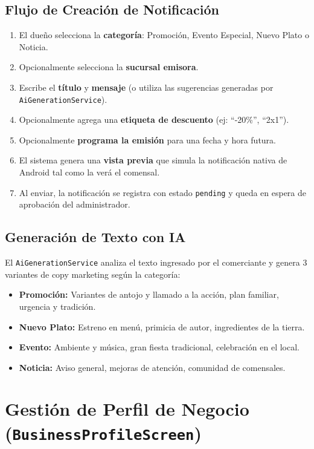 \documentclass[11pt, a4paper, oneside]{report}
\begin{document}
\subsection{Flujo de Creación de Notificación}
\begin{enumerate}
  \item El dueño selecciona la \textbf{categoría}: Promoción, Evento Especial, Nuevo Plato o Noticia.
  \item Opcionalmente selecciona la \textbf{sucursal emisora}.
  \item Escribe el \textbf{título} y \textbf{mensaje} (o utiliza las sugerencias generadas por \texttt{AiGenerationService}).
  \item Opcionalmente agrega una \textbf{etiqueta de descuento} (ej: ``-20\%'', ``2x1'').
  \item Opcionalmente \textbf{programa la emisión} para una fecha y hora futura.
  \item El sistema genera una \textbf{vista previa} que simula la notificación nativa de Android tal como la verá el comensal.
  \item Al enviar, la notificación se registra con estado \texttt{pending} y queda en espera de aprobación del administrador.
\end{enumerate}

\subsection{Generación de Texto con IA}
El \texttt{AiGenerationService} analiza el texto ingresado por el comerciante y genera 3 variantes de copy marketing según la categoría:
\begin{itemize}
  \item \textbf{Promoción:} Variantes de antojo y llamado a la acción, plan familiar, urgencia y tradición.
  \item \textbf{Nuevo Plato:} Estreno en menú, primicia de autor, ingredientes de la tierra.
  \item \textbf{Evento:} Ambiente y música, gran fiesta tradicional, celebración en el local.
  \item \textbf{Noticia:} Aviso general, mejoras de atención, comunidad de comensales.
\end{itemize}

\section{Gestión de Perfil de Negocio (\texttt{BusinessProfileScreen})}
\end{document}
